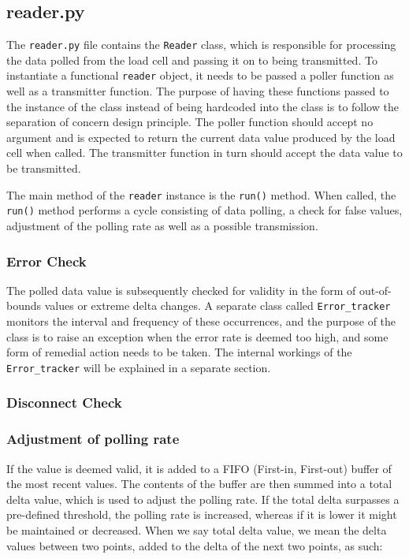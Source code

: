 \subsection{reader.py}
The \lstinline{reader.py} file contains the \lstinline{Reader} class, which is responsible for processing the data polled from the load cell and passing it on to being transmitted. To instantiate a functional \lstinline{reader} object, it needs to be passed a poller function as well as a transmitter function. The purpose of having these functions passed to the instance of the class instead of being hardcoded into the class is to follow the separation of concern design principle.\cite{sep-concern} The poller function should accept no argument and is expected to return the current data value produced by the load cell when called. The transmitter function in turn should accept the data value to be transmitted.

The main method of the \lstinline{reader} instance is the \lstinline{run()} method. When called, the \lstinline{run()} method performs a cycle consisting of data polling, a check for false values, adjustment of the polling rate as well as a possible transmission. 

\subsubsection{Error Check}
The polled data value is subsequently checked for validity in the form of out-of-bounds values or extreme delta changes. A separate class called \lstinline{Error_tracker} monitors the interval and frequency of these occurrences, and the purpose of the class is to raise an exception when the error rate is deemed too high, and some form of remedial action needs to be taken. The internal workings of the \lstinline{Error_tracker} will be explained in a separate section.

\subsubsection{Disconnect Check}

\subsubsection{Adjustment of polling rate}
If the value is deemed valid, it is added to a FIFO (First-in, First-out) buffer of the most recent values. The contents of the buffer are then summed into a total delta value, which is used to adjust the polling rate. If the total delta surpasses a pre-defined threshold, the polling rate is increased, whereas if it is lower it might be maintained or decreased. When we say total delta value, we mean the delta values between two points, added to the delta of the next two points, as such:


